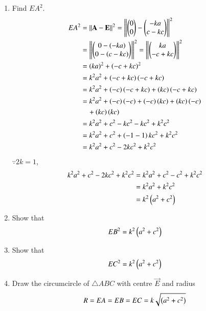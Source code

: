 \documentclass[journal,12pt,twocolumn]{IEEEtran}
\renewcommand\thesection{\arabic{section}}
\begin{document}
\begin{enumerate}[label=\thesection.\arabic*
,ref=\thesection.\theenumi]
\item Find $EA^2$.
\\
\solution 
\begin{align*}
EA^2 &= \left\Vert\mathbf{A}-\mathbf{E}\right\Vert^2=\left\Vert\begin{pmatrix}0 \\0\end{pmatrix}-\begin{pmatrix}-ka \\c-kc\end{pmatrix}\right\Vert^2 
\\
&= \left\Vert\begin{pmatrix}0 -\left(-ka\right)\\0-\left(c-kc\right)\end{pmatrix}\right\Vert^2 
=\left\Vert\begin{pmatrix}ka\\-c+kc\end{pmatrix}\right\Vert^2 
\\
&=\left(ka\right)^2+\left(-c+kc\right)^2 
\\
&= k^2a^2+\left(-c+kc\right)\left(-c+kc\right)
\\
&= k^2a^2+\left(-c\right)\left(-c+kc\right)+\left(kc\right)\left(-c+kc\right)
\\
&=k^2a^2+\left(-c\right)\left(-c\right)+\left(-c\right)\left(kc\right)+\left(kc\right)\left(-c\right)
\\
&\quad +\left(kc\right)\left(kc\right)
\\
&= k^2a^2+c^2-kc^2-kc^2+k^2c^2
\\
&=k^2a^2+c^2+\left(-1-1\right)kc^2+k^2c^2
\\
&=k^2a^2+c^2-2kc^2+k^2c^2
\end{align*}
$\because 2k=1$,
\begin{align*}
k^2a^2+c^2-2kc^2+k^2c^2 &= k^2a^2+c^2-c^2+k^2c^2  
\\
&= k^2a^2 + k^2c^2
\\
&= k^2\left(a^2 + c^2\right)
\end{align*}

\item Show that 
\begin{align}
EB^2 =  k^2\left(a^2 + c^2\right)
\end{align}
\item Show that 
\begin{align}
EC^2 =  k^2\left(a^2 + c^2\right)
\end{align}

\item Draw the circumcircle of  $\triangle ABC$ with centre $\vec{E}$
and radius 
\begin{align}
R =  EA = EB=EC=k\sqrt{\left(a^2 + c^2\right)}
\end{align}
\end{enumerate}
\end{document}
